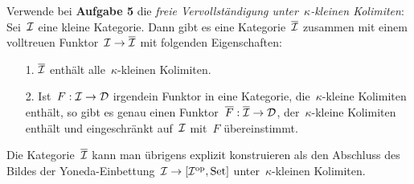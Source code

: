 \documentclass{uebblatt}
\begin{document}
Verwende bei \textbf{Aufgabe 5} die \emph{freie Vervollständigung
unter~$\kappa$-kleinen Kolimiten}: Sei~$\mathcal{I}$ eine kleine Kategorie. Dann gibt es
eine Kategorie~$\overline{\mathcal{I}}$ zusammen mit einem volltreuen Funktor~$\mathcal{I} \to
\overline{\mathcal{I}}$ mit folgenden Eigenschaften:
\begin{enumerate}
\item[1.] $\overline{\mathcal{I}}$ enthält alle~$\kappa$-kleinen Kolimiten.
\item[2.] Ist~$F : \mathcal{I} \to \mathcal{D}$ irgendein Funktor in eine Kategorie,
die~$\kappa$-kleine Kolimiten enthält, so gibt es genau einen
Funktor~$\overline{F} : \overline{\mathcal{I}} \to \mathcal{D}$, der~$\kappa$-kleine Kolimiten
enthält und eingeschränkt auf~$\mathcal{I}$ mit~$F$ übereinstimmt.
\end{enumerate}
Die Kategorie~$\overline{\mathcal{I}}$ kann man übrigens explizit konstruieren als den
Abschluss des Bildes der Yoneda-Einbettung~$\mathcal{I} \to [\mathcal{I}^{\mathrm{op}},\mathrm{Set}]$
unter~$\kappa$-kleinen Kolimiten.
\end{document}
